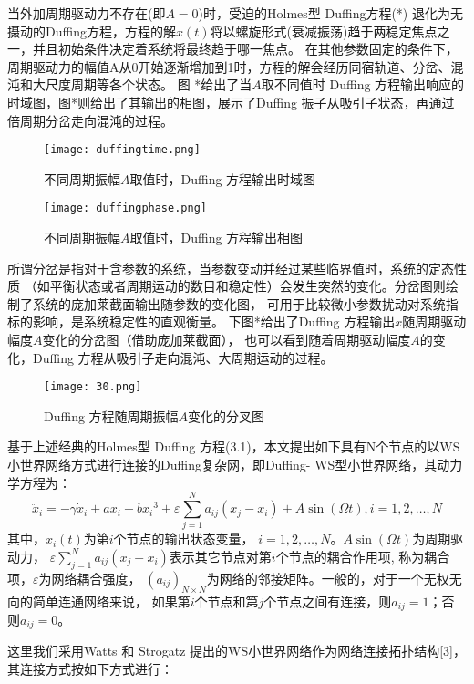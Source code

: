 当外加周期驱动力不存在(即$A=0$)时，受迫的Holmes型 Duffing方程(*)
退化为无摄动的Duffing方程，方程的解$x\left(t\right)$将以螺旋形式(衰减振荡)趋于两稳定焦点之一，并且初始条件决定着系统将最终趋于哪一焦点。
在其他参数固定的条件下，周期驱动力的幅值A从0开始逐渐增加到1时，方程的解会经历同宿轨道、分岔、混沌和大尺度周期等各个状态。
图 *给出了当$A$取不同值时 Duffing 方程输出响应的时域图，图*则给出了其输出的相图，展示了Duffing 振子从吸引子状态，再通过倍周期分岔走向混沌的过程。
 \begin{figure}[!htbp]
    \centering
    \texttt{[image: duffingtime.png]}\caption{不同周期振幅$A$取值时，Duffing 方程输出时域图}
 \end{figure}

 \begin{figure}[!htbp]
    \centering
    \texttt{[image: duffingphase.png]}\caption{不同周期振幅$A$取值时，Duffing 方程输出相图}
 \end{figure}

所谓分岔是指对于含参数的系统，当参数变动并经过某些临界值时，系统的定态性质
（如平衡状态或者周期运动的数目和稳定性）会发生突然的变化。分岔图则绘制了系统的庞加莱截面输出随参数的变化图，
可用于比较微小参数扰动对系统指标的影响，是系统稳定性的直观衡量。 下图*给出了Duffing 方程输出$x$随周期驱动幅度$A$变化的分岔图（借助庞加莱截面），
也可以看到随着周期驱动幅度$A$的变化，Duffing 方程从吸引子走向混沌、大周期运动的过程。
 \begin{figure}[!htbp]
    \centering
    \texttt{[image: 30.png]}\caption{Duffing 方程随周期振幅$A$变化的分叉图}
 \end{figure}


基于上述经典的Holmes型 Duffing 方程(3.1)，本文提出如下具有N个节点的以WS小世界网络方式进行连接的Duffing复杂网，即Duffing- WS型小世界网络，其动力学方程为：
\begin{equation}
    \ddot{x}_{i}=-\gamma \dot{x}_{i}+a x_{i}-b x_{i}{ }^{3}+\varepsilon \sum_{j=1}^{N} a_{i j}\left(x_{j}-x_{i}\right)+A \sin (\Omega t), i=1,2, \ldots, N
\end{equation}
其中，$x_i(t)$为第$i$个节点的输出状态变量， $i=1,2,\ldots,N$。$A\sin(\Omega t)$为周期驱动力， 
$\varepsilon \sum_{j=1}^{N} a_{i j}\left(x_{j}-x_{i}\right)$表示其它节点对第$i$个节点的耦合作用项, 称为耦合项，$\varepsilon$为网络耦合强度，
$\left(a_{ij}\right)_{N\times N}$为网络的邻接矩阵。一般的，对于一个无权无向的简单连通网络来说，
如果第$i$个节点和第$j$个节点之间有连接，则$a_{ij} = 1$；否则$a_{ij} = 0$。

这里我们采用Watts 和 Strogatz 提出的WS小世界网络作为网络连接拓扑结构[3]，其连接方式按如下方式进行：

